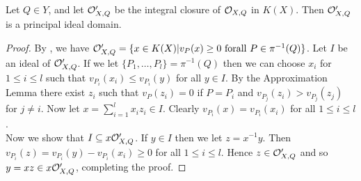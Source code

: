 \begin{lem}\label{pidlemma}
 Let $Q\in Y$, and let ${\cal O}_{X,Q}'$ be the integral closure of ${\cal O}_{X,Q}$ in $K(X)$.
 Then ${\cal O}_{X,Q}'$ is a principal ideal domain.
\end{lem}
\begin{proof}
 By \cite[Cor. III.3.5]{stichtenoth}, we have ${\cal O}_{X,Q}' = \{x\in K(X)|v_P(x) \geq 0 \ {\rm for all} \ P\in \pi^{-1}(Q)\}$.
 Let $I$ be an ideal of ${\cal O}_{X,Q}'$.
 If we let $\{P_1,\ldots, P_l\} = \pi^{-1}(Q)$ then we can choose $x_i$ for $1\leq i \leq l$ such that $v_{P_i}(x_i) \leq v_{P_i}(y)$ for all $y\in I$.
 By the Approximation Lemma there exist $z_i$ such that $v_P (z_i) = 0$ if $P=P_i$ and $v_{P_j}(z_i) > v_{P_j}(z_j)$ for $j\neq i$.
 Now let $x = \sum_{i=1}^l x_iz_i \in I$.
 Clearly $v_{P_i}(x) = v_{P_i}(x_i)$ for all $1\leq i\leq l$.\\
 Now we show that $I \subseteq x{\cal O}_{X,Q}'$.
 If $y\in I$ then we let $z = x^{-1}y$.
 Then $v_{P_i}(z) = v_{P_i}(y) - v_{P_i}(x_i) \geq 0$ for all $1\leq i\leq l$.
Hence $z\in {\cal O}_{X,Q}'$ and so $y = xz \in x{\cal O}_{X,Q}'$, completing the proof.
\end{proof}


